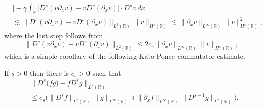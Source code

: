 \documentclass{beamer}
\newcommand{\rr}{\mathbb{R}}
\newcommand{\p}{\partial}
\begin{document}
\begin{frame}

\begin{equation*} \label{int1-est-calc2}
\begin{split}
& \Big|
- \gamma \int_\rr
\big[ D^s(v\p_x v)  -  v D^s (\p_xv)
\big]
\cdot D^s v   \, dx
\Big|
\\
& \lesssim
\|
D^s(v\p_x v)  -  v D^s (\p_xv)
\|_{L^2(\rr)}
\|
v
\|_{H^s(\rr)}
\lesssim \| \p_x v \|_{L^\infty(\rr)} \| v \|_{H^s(\rr)}^2,
\end{split}
\end{equation*}
%
%
%
where the last step follows from 
%
%
%
\begin{equation*} \label{int1-est-calc3}
\| D^s(v\p_x v)  -  v D^s (\p_xv) \|_{L^2(\rr)}
\le
2 c_s    \| \p_x v \|_{L^\infty(\rr)} \| v \|_{H^s(\rr)},
\end{equation*}
%
%
which is a simple corollary of the following Kato-Ponce commutator 
estimate.
%
%
\begin{lemma} \label{KP-lemma}
If  $s>0$ then there is $c_s>0$ such that 
%
%
%
\begin{equation*} \begin{split}
& \| D^{s} \big(fg) -  f D^s g\|_{L^2(\rr)}
\\
& \le
c_s \big(
\| D^{s}f \|_{L^2(\rr)}    \| g \|_{L^\infty(\rr)} 
+ \| \p_xf \|_{L^\infty(\rr)}    \| D^{s-1}g \|_{L^2(\rr)}   \big).
\end{split}
\end{equation*}
%
%
%
\end{lemma}
%
%
\end{frame}
\end{document}
